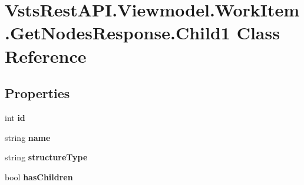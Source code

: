 \hypertarget{class_vsts_rest_a_p_i_1_1_viewmodel_1_1_work_item_1_1_get_nodes_response_1_1_child1}{}\section{Vsts\+Rest\+A\+P\+I.\+Viewmodel.\+Work\+Item.\+Get\+Nodes\+Response.\+Child1 Class Reference}
\label{class_vsts_rest_a_p_i_1_1_viewmodel_1_1_work_item_1_1_get_nodes_response_1_1_child1}
\subsection*{Properties}
\begin{DoxyCompactItemize}
\item 
\mbox{\label{class_vsts_rest_a_p_i_1_1_viewmodel_1_1_work_item_1_1_get_nodes_response_1_1_child1_abef269538b44293abf147a19e43a8399}} 
int {\bfseries id}
\item 
\mbox{\label{class_vsts_rest_a_p_i_1_1_viewmodel_1_1_work_item_1_1_get_nodes_response_1_1_child1_a0db9b2cac4d048f905b28b0daabca045}} 
string {\bfseries name}
\item 
\mbox{\label{class_vsts_rest_a_p_i_1_1_viewmodel_1_1_work_item_1_1_get_nodes_response_1_1_child1_a5ab2bd90ad484f47b9b489564d4356ed}} 
string {\bfseries structure\+Type}
\item 
\mbox{\label{class_vsts_rest_a_p_i_1_1_viewmodel_1_1_work_item_1_1_get_nodes_response_1_1_child1_ab04fbd79e94f67ab4af5ab1da1396bb9}} 
bool {\bfseries has\+Children}
\item 

\end{DoxyCompactItemize}
